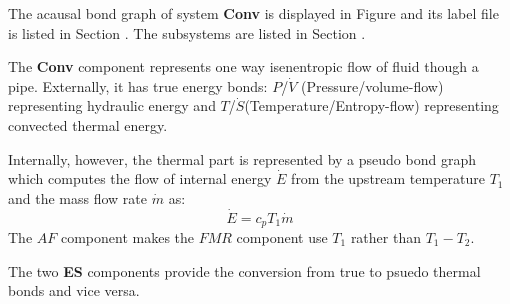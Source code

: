 

   The acausal bond graph of system \textbf{Conv} is
   displayed in Figure  and its label
   file is listed in Section .
   The subsystems are listed in Section .

The \textbf{Conv} component represents one way isenentropic flow of 
fluid though a pipe. Externally, it has true energy bonds: $P$/$\dot V$
(Pressure/volume-flow) representing hydraulic energy and $T$/$\dot
S$(Temperature/Entropy-flow) representing convected thermal energy.

Internally, however, the thermal part is represented by a pseudo bond
graph which computes the flow of internal energy $\dot E$ from the
upstream temperature $T_1$ and the mass flow rate $\dot m$ as:
\begin{equation}
  \dot E = c_p T_1 \dot m
\end{equation}
The $AF$ component makes the $FMR$ component use $T_1$ rather than
$T_1-T_2$.

The two \textbf{ES} components provide the conversion from true to
psuedo thermal bonds and vice versa.


